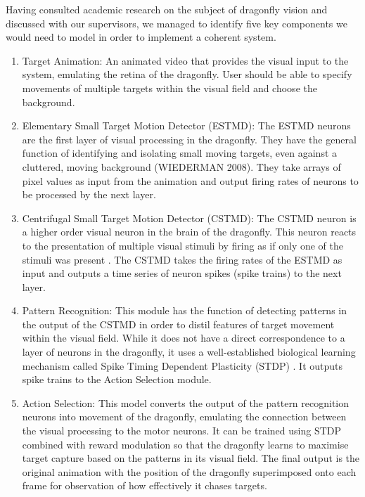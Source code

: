 \documentclass[a4paper,11pt]{article}
\begin{document}
Having consulted academic research on the subject of dragonfly vision and discussed with our supervisors, we managed to identify five key components we would need to model in order to implement a coherent system. 

\begin{enumerate}
\item{Target Animation:} An animated video that provides the visual input to the system, emulating the retina of the dragonfly. User should be able to specify movements of multiple targets within the visual field and choose the background.
\item{Elementary Small Target Motion Detector (ESTMD):} The ESTMD neurons are the first layer of visual processing in the dragonfly. They have the general function of identifying and isolating small moving targets, even against a cluttered, moving background (WIEDERMAN 2008). They take arrays of pixel values as input from the animation and output firing rates of neurons to be processed by the next layer.
\item{Centrifugal Small Target Motion Detector (CSTMD):} The CSTMD neuron is a higher order visual neuron in the brain of the dragonfly. This neuron reacts to the presentation of multiple visual stimuli by firing as if only one of the stimuli was present \cite{w13}. The CSTMD takes the firing rates of the ESTMD as input and outputs a time series of neuron spikes (spike trains) to the next layer.
\item{Pattern Recognition:} This module has the function of detecting patterns in the output of the CSTMD in order to distil features of target movement within the visual field. While it does not have a direct correspondence to a layer of neurons in the dragonfly, it uses a well-established biological learning mechanism called Spike Timing Dependent Plasticity (STDP) \cite{stdp1}\cite{stdp2}. It outputs spike trains to the Action Selection module.
\item{Action Selection:} This model converts the output of the pattern recognition neurons into movement of the dragonfly, emulating the connection between the visual processing to the motor neurons. It can be trained using STDP combined with reward modulation so that the dragonfly learns to maximise target capture based on the patterns in its visual field. The final output is the original animation with the position of the dragonfly superimposed onto each frame for observation of how effectively it chases targets.
\end{enumerate}
\end{document}
